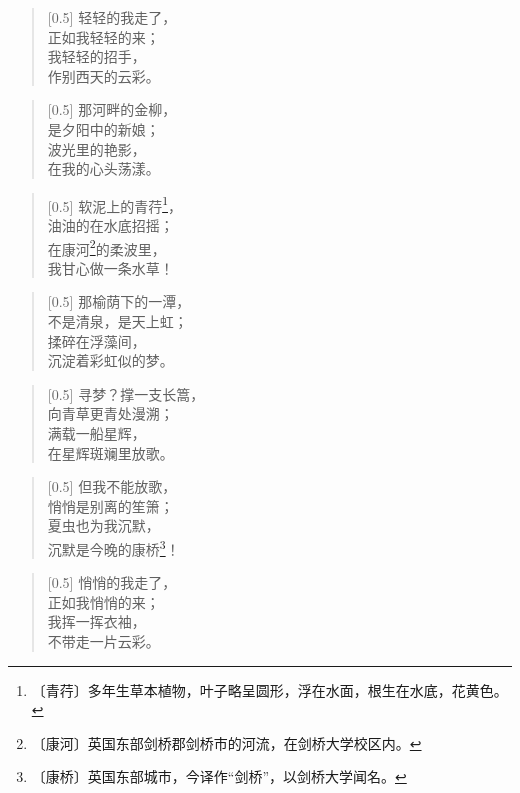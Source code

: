 \documentclass[12pt,UTF-8,openany]{ctexbook}
\begin{document}
\begin{large}
    
    \begin{verse}[0.5\linewidth]
        轻轻的我走了， \\
        正如我轻轻的来； \\
        我轻轻的招手， \\
        作别西天的云彩。
    \end{verse}
    
    
    \begin{verse}[0.5\linewidth]
        那河畔的金柳， \\
        是夕阳中的新娘； \\
        波光里的艳影， \\
        在我的心头荡漾。
    \end{verse}
    
    
    \begin{verse}[0.5\linewidth]
        软泥上的青荇\footnote{〔青荇〕多年生草本植物，叶子略呈圆形，浮在水面，根生在水底，花黄色。}， \\
        油油的在水底招摇； \\
        在康河\footnote{〔康河〕英国东部剑桥郡剑桥市的河流，在剑桥大学校区内。}的柔波里， \\
        我甘心做一条水草！
    \end{verse}
    
    
    \begin{verse}[0.5\linewidth]
        那榆荫下的一潭， \\
        不是清泉，是天上虹； \\
        揉碎在浮藻间， \\
        沉淀着彩虹似的梦。
    \end{verse}
    
    
    \begin{verse}[0.5\linewidth]
        寻梦？撑一支长篙， \\
        向青草更青处漫溯； \\
        满载一船星辉， \\
        在星辉斑斓里放歌。
    \end{verse}
    
    
    \begin{verse}[0.5\linewidth]
        但我不能放歌， \\
        悄悄是别离的笙箫； \\
        夏虫也为我沉默， \\
        沉默是今晚的康桥\footnote{〔康桥〕英国东部城市，今译作“剑桥”，以剑桥大学闻名。}！
    \end{verse}
    
    
    \begin{verse}[0.5\linewidth]
        悄悄的我走了， \\
        正如我悄悄的来； \\
        我挥一挥衣袖， \\
        不带走一片云彩。
    \end{verse}
    
\end{large}
\end{document}
